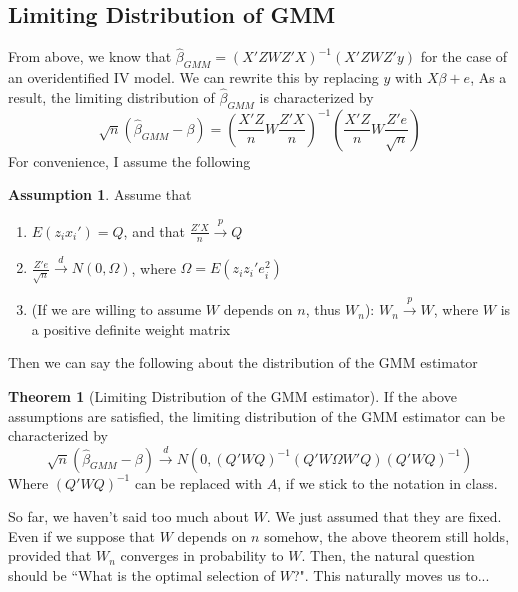 \documentclass[12pt]{article}
\theoremstyle{definition}
\theoremstyle{property}
\theoremstyle{assumption}
\newtheorem{assumption}{Assumption}[section]
\theoremstyle{example}
\theoremstyle{comment}
\newtheorem{theorem}{Theorem}[section]
\begin{document}
\subsection{Limiting Distribution of GMM}
From above, we know that $\hat{\beta}_{GMM}=(X'ZWZ'X)^{-1}(X'ZWZ'y)$ for the case of an overidentified IV model. We can rewrite this by replacing $y$ with $X\beta+e$, As a result, the limiting distribution of $\hat{\beta}_{GMM}$ is characterized by
\[
\sqrt{n}(\hat{\beta}_{GMM}-\beta)=\left(\frac{X'Z}{n}W\frac{Z'X}{n}\right)^{-1}\left(\frac{X'Z}{n}W\frac{Z'e}{\sqrt{n}}\right)
\]
For convenience, I assume the following
\begin{mdframed}[backgroundcolor=blue!5] 
\begin{assumption}
Assume that
\begin{enumerate}
\item $E(z_ix_i')=Q$, and that $\frac{Z'X}{n}\xrightarrow{p}Q$
\item $\frac{Z'e}{\sqrt{n}}\xrightarrow{d}N(0,\Omega)$, where $\Omega = E(z_iz_i'e_i^2)$
\item (If we are willing to assume $W$ depends on $n$, thus $W_n$): $W_n\xrightarrow{p}W$, where $W$ is a positive definite weight matrix
\end{enumerate}
\end{assumption}
\end{mdframed}
Then we can say the following about the distribution of the GMM estimator
\begin{mdframed}[backgroundcolor=green!5] 
\begin{theorem}[Limiting Distribution of the GMM estimator] If the above assumptions are satisfied, the limiting distribution of the GMM estimator can be characterized by
\[
\sqrt{n}(\hat{\beta}_{GMM}-\beta)\xrightarrow{d}N(0,(Q'WQ)^{-1}(Q'W\Omega W'Q)(Q'WQ)^{-1})
\]
Where $(Q'WQ)^{-1}$ can be replaced with $A$, if we stick to the notation in class. 
\end{theorem}
\end{mdframed}\par
So far, we haven't said too much about $W$. We just assumed that they are fixed. Even if we suppose that $W$ depends on $n$ somehow, the above theorem still holds, provided that $W_n$ converges in probability to $W$. Then, the natural question should be ``What is the optimal selection of $W$?". This naturally moves us to...
\end{document}
